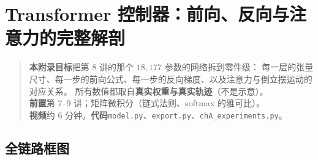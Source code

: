 \chapter[Transformer 内部机制]{Transformer 控制器：前向、反向与注意力的完整解剖}
\label{ch:inner}

\begin{quote}\small
\textbf{本附录目标}\quad 把第 8 讲的那个 $18{,}177$ 参数的网络拆到零件级：
每一层的张量尺寸、每一步的前向公式、每一步的反向梯度、以及注意力与倒立摆运动的对应关系。
所有数值都取自\textbf{真实权重与真实轨迹}（不是示意）。\\[2pt]
\textbf{前置}\quad 第 7–9 讲；矩阵微积分（链式法则、softmax 的雅可比）。\\
\textbf{视频}\quad 约 6 分钟。\quad\textbf{代码}\quad \texttt{model.py}、\texttt{export.py}、\texttt{chA\_experiments.py}。
\end{quote}

\section{全链路框图}

